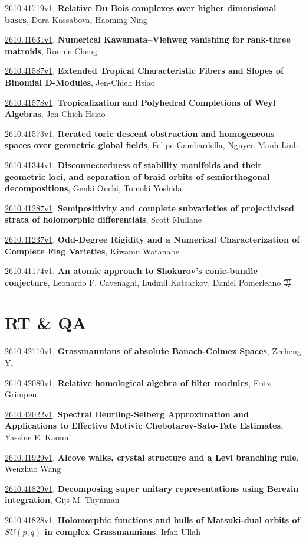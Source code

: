\documentclass[9pt, a4paper]{article}
\theoremstyle{plain}
\theoremstyle{definition}
\theoremstyle{remark}
\newcommand{\arxiv}[3]{\href{https://arxiv.org/abs/#1}{#1}, \textbf{\textcolor{arxivblue}{#2}}, #3}
\begin{document}
\arxiv{2610.41719v1}{Relative Du Bois complexes over higher dimensional bases}{Dora Kassabova, Haoming Ning}

\arxiv{2610.41631v1}{Numerical Kawamata--Viehweg vanishing for rank-three matroids}{Ronnie Cheng}

\arxiv{2610.41587v1}{Extended Tropical Characteristic Fibers and Slopes of Binomial D-Modules}{Jen-Chieh Hsiao}

\arxiv{2610.41578v1}{Tropicalization and Polyhedral Completions of Weyl Algebras}{Jen-Chieh Hsiao}

\arxiv{2610.41573v1}{Iterated toric descent obstruction and homogeneous spaces over geometric global fields}{Felipe Gambardella, Nguyen Manh Linh}

\arxiv{2610.41344v1}{Disconnectedness of stability manifolds and their geometric loci, and separation of braid orbits of semiorthogonal decompositions}{Genki Ouchi, Tomoki Yoshida}

\arxiv{2610.41287v1}{Semipositivity and complete subvarieties of projectivised strata of holomorphic differentials}{Scott Mullane}

\arxiv{2610.41237v1}{Odd-Degree Rigidity and a Numerical Characterization of Complete Flag Varieties}{Kiwamu Watanabe}

\arxiv{2610.41174v1}{An atomic approach to Shokurov's conic-bundle conjecture}{Leonardo F. Cavenaghi, Ludmil Katzarkov, Daniel Pomerleano 等}


\section{RT \& QA}
\arxiv{2610.42110v1}{Grassmannians of absolute Banach-Colmez Spaces}{Zecheng Yi}

\arxiv{2610.42080v1}{Relative homological algebra of filter modules}{Fritz Grimpen}

\arxiv{2610.42022v1}{Spectral Beurling-Selberg Approximation and Applications to Effective Motivic Chebotarev-Sato-Tate Estimates}{Yassine El Kaouni}

\arxiv{2610.41929v1}{Alcove walks, crystal structure and a Levi branching rule}{Wenzhuo Wang}

\arxiv{2610.41829v1}{Decomposing super unitary representations using Berezin integration}{Gijs M. Tuynman}

\arxiv{2610.41828v1}{Holomorphic functions and hulls of Matsuki-dual orbits of $SU(p,q)$ in complex Grassmannians}{Irfan Ullah}
\end{document}
